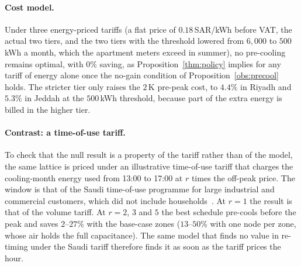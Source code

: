 \documentclass[10pt,a4paper,twocolumn]{article}
\theoremstyle{definition}
\begin{document}
\paragraph{Cost model.}\label{sec:senscost} Under three energy-priced tariffs (a flat price of $0.18\,$SAR/kWh before VAT, the actual two tiers, and the two tiers with the threshold lowered from $6{,}000$ to $500\,$kWh a month, which the apartment meters exceed in summer), no pre-cooling remains optimal, with $0\%$ saving, as Proposition~\ref{thm:policy} implies for any tariff of energy alone once the no-gain condition of Proposition~\ref{obs:precool} holds. The stricter tier only raises the $2\,$K pre-peak cost, to $4.4\%$ in Riyadh and $5.3\%$ in Jeddah at the $500\,$kWh threshold, because part of the extra energy is billed in the higher tier.

\paragraph{Contrast: a time-of-use tariff.} To check that the null result is a property of the tariff rather than of the model, the same lattice is priced under an illustrative time-of-use tariff that charges the cooling-month energy used from 13:00 to 17:00 at $r$ times the off-peak price. The window is that of the Saudi time-of-use programme for large industrial and commercial customers, which did not include households~\citep{sec_tou2010}. At $r=1$ the result is that of the volume tariff. At $r=2$, $3$ and $5$ the best schedule pre-cools before the peak and saves $2$--$27$\% with the base-case zones ($13$--$50$\% with one node per zone, whose air holds the full capacitance). The same model that finds no value in re-timing under the Saudi tariff therefore finds it as soon as the tariff prices the hour.
\end{document}
